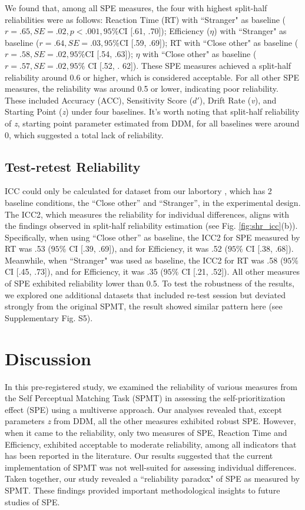 \documentclass[sn-apa]{sn-jnl}%
\theoremstyle{thmstyleone}%
\theoremstyle{thmstyletwo}%
\theoremstyle{thmstylethree}%
\begin{document}
We found that, among all SPE measures, the four with highest split-half reliabilities were as follows: Reaction Time (RT) with ``Stranger" as baseline ($r = .65, SE = .02, p <.001, 95\% $CI [.61, .70]); Efficiency ($\eta$) with ``Stranger" as baseline ($r = .64, SE  = .03, 95\% $CI [.59, .69]); RT with ``Close other" as baseline ($r = .58, SE = .02, 95\% $CI [.54, .63]); $\eta$ with ``Close other" as baseline ($r = .57, SE = .02, 95\% $ CI [.52, . 62]). These SPE measures achieved a split-half reliability around 0.6 or higher, which is considered acceptable. For all other SPE measures, the reliability was around 0.5 or lower, indicating poor reliability. These included Accuracy (ACC), Sensitivity Score ($d'$), Drift Rate (\textit{v}), and Starting Point (\textit{z}) under four baselines. It's worth noting that split-half reliability of \textit{z}, starting point parameter estimated from DDM, for all baselines were around 0, which suggested a total lack of reliability.


\subsection{Test-retest Reliability}\label{subsec:testretest}

ICC could only be calculated for dataset from our labortory \parencite{hu2023data}, which has 2 baseline conditions, the ``Close other” and ``Stranger”, in the experimental design. The ICC2, which measures the reliability for individual differences, aligns with the findings observed in split-half reliability estimation (see Fig. \ref{fig:shr_icc}(b)). Specifically, when using ``Close other” as baseline, the ICC2 for SPE measured by RT was .53 ($95\%$ CI [.39, .69]), and for Efficiency, it was .52 ($95\%$ CI [.38, .68]). Meanwhile, when ``Stranger" was used as baseline, the ICC2 for RT was .58 ($95\%$ CI [.45, .73]), and for Efficiency, it was .35 ($95\%$ CI [.21, .52]). All other measures of SPE exhibited reliability lower than 0.5. To test the robustness of the results, we explored one additional datasets that included re-test session but deviated strongly from the original SPMT, the result showed similar pattern here (see Supplementary Fig. S5).
\clearpage

\section{Discussion}\label{sec5}

In this pre-registered study, we examined the reliability of various measures from the Self Perceptual Matching Task (SPMT) in assessing the self-prioritization effect (SPE) using a multiverse approach. Our analyses revealed that, except parameters \textit{z} from DDM, all the other measures exhibited robust SPE. However, when it came to the reliability, only two measures of SPE, Reaction Time and Efficiency, exhibited acceptable to moderate reliability, among all indicators that has been reported in the literature. Our results suggested that the current implementation of SPMT was not well-suited for assessing individual differences. Taken together, our study revealed a ``reliability paradox" of SPE as measured by SPMT. These findings provided important methodological insights to future studies of SPE.
\end{document}
